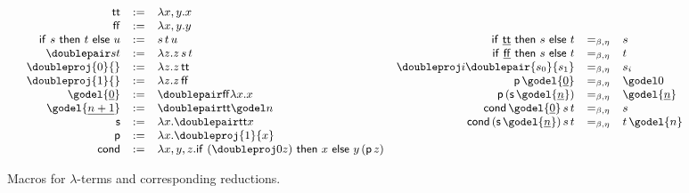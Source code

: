 \documentclass[10pt,a4paper]{amsart}
\theoremstyle{plain}
\theoremstyle{definition}
\newcommand{\dfn}{:=}
\theoremstyle{plain}
\theoremstyle{definition} %
\renewcommand{\succ}{\mathsf s}
\newcommand{\pred}{\mathsf{p}}
\newcommand{\numeral}[1]{\underline{#1}}
\newcommand{\cnd}{\mathsf{cond}}
\newcommand{\identity}{\mathsf{I}}
\newcommand{\enc}[1]{\underline{#1}}
\newcommand{\true}{\mathsf{tt}}
\newcommand{\false}{\mathsf{ff}}
\newcommand{\letpair}[4]{\mathsf{let}\ {#1}\ \mathsf{ be \ }{#2},{#3}\mathsf{\ in \ }{#4}}
\newcommand{\inject}[2]{\mathsf{inj}_{#1}(#2)}
\newcommand{\project}[2]{\mathsf{p}_{#1}(#2)}
\newcommand{\letid}[2]{\mathsf{let}\ {#1}\ \mathsf{ be \ }\identity \mathsf{\ in \ }{#2}}
\newcommand{\ifthen}[3]{\mathsf{if \ }{#1}\mathsf{\ then\ }{#2}\mathsf{\ else\ }{#3}}
\newcommand{\betaeta}{=_{\beta, \eta}}
\begin{document}
\begin{figure}[t]
    \centering
 \[
 \small
\begin{array}{rcl}
 \true&\dfn& \lambda x,y. x\\
      \false &\dfn& \lambda x,y. y\\
 \ifthen s t u   & \dfn & s \, t \, u \\
      \doublepair s t & \dfn & \lambda z.z\, s\, t\\
      \doubleproj{0}{} &\dfn&  \lambda z. z \, \true \\
         \doubleproj{1}{} &\dfn&  \lambda z. z \, \false \\
  \godel {\numeral 0} & \dfn & \doublepair \false  {\lambda x.x}   \\
    \godel {\numeral{n+1}} &\dfn  & \doublepair \true {\godel n} \\
    \succ &\dfn & \lambda x. \doublepair \true   x \\
     \pred  &\dfn & \lambda x. \doubleproj{1}{x}  \\
    \cnd &\dfn &\lambda x,y,z. \ifthen{(\doubleproj 0 z)}{x}{y\, ({\pred \, z})}  
      \end{array}
      \begin{array}{rcl}
\ifthen {\enc{\true}} s t & \betaeta & s\\
\ifthen {\enc{\false}} s t & \betaeta & t\\
 \doubleproj i {\doublepair {s_0} {s_1}} & \betaeta & s_i\\
 \pred \, {\godel {\numeral 0}} &\betaeta & \godel 0\\
 \pred\,  {(\succ \, {\godel {\numeral n}})} &\betaeta & \godel {\numeral n}\\
  \cnd \, {\godel {\numeral 0}} \, s \, t &\betaeta & s\\
 \cnd \, {(\succ \, {\godel {\numeral n}})}\, s \, t &\betaeta & t \, \godel{n}\\
 \end{array}
\]

    \caption{Macros for $\lambda$-terms  and corresponding reductions.}
    \label{fig:abbreviation}
\end{figure}
\end{document}
